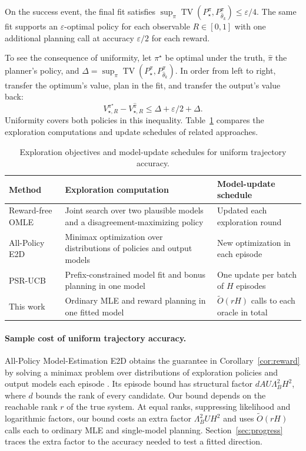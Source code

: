 \documentclass[sigconf,nonacm]{acmart}
\newcommand{\TV}{\operatorname{TV}}
\newcommand{\wh}{\widehat}
\newcommand{\eps}{\varepsilon}
\newcommand{\softO}{\widetilde O}
\newcommand{\st}{\star}
\begin{document}
\begin{corollary}\label{cor:reward}
On the success event, the final fit satisfies $\sup_\pi\TV(P_\st^\pi,P_{\wh\theta_k}^\pi)\le\eps/4$. The same fit supports an $\eps$-optimal policy for each observable $R\in[0,1]$ with one additional planning call at accuracy $\eps/2$ for each reward.
\end{corollary}
To see the consequence of uniformity, let $\pi^\star$ be optimal under the truth, $\hat\pi$ the planner's policy, and $\Delta=\sup_\pi\TV(P_\st^\pi,P_{\wh\theta_k}^\pi)$. In order from left to right, transfer the optimum's value, plan in the fit, and transfer the output's value back:
\[
 V_{\st,R}^{\pi^\star}-V_{\st,R}^{\hat\pi}
 \le \Delta+\eps/2+\Delta .
\]
Uniformity covers both policies in this inequality. Table~\ref{tab:comparison} compares the exploration computations and update schedules of related approaches.

\begin{table}[t]
\caption{Exploration objectives and model-update schedules for uniform trajectory accuracy.}
\label{tab:comparison}
\small
\begin{tabularx}{\textwidth}{@{}p{}X p{}@{}}
\toprule
Method & Exploration computation & Model-update schedule \\
\midrule
Reward-free OMLE \cite{omle} & Joint search over two plausible models and a disagreement-maximizing policy & Updated each exploration round \\
All-Policy E2D \cite{bstable} & Minimax optimization over distributions of policies and output models & New optimization in each episode \\
PSR-UCB \cite{psrucb} & Prefix-constrained model fit and bonus planning in one model & One update per batch of $H$ episodes \\
This work & Ordinary MLE and reward planning in one fitted model & $\softO(rH)$ calls to each oracle in total \\
\bottomrule
\end{tabularx}
\end{table}

\paragraph{Sample cost of uniform trajectory accuracy.}
All-Policy Model-Estimation E2D obtains the guarantee in Corollary~\ref{cor:reward} by solving a minimax problem over distributions of exploration policies and output models each episode \cite[Theorem~H.4]{bstable}. Its episode bound has structural factor $dAU\Lambda_B^2H^2$, where $d$ bounds the rank of every candidate. Our bound depends on the reachable rank $r$ of the true system. At equal ranks, suppressing likelihood and logarithmic factors, our bound costs an extra factor $\Lambda_B^2UH^2$ and uses $\softO(rH)$ calls each to ordinary MLE and single-model planning. Section~\ref{sec:progress} traces the extra factor to the accuracy needed to test a fitted direction.
\end{document}
